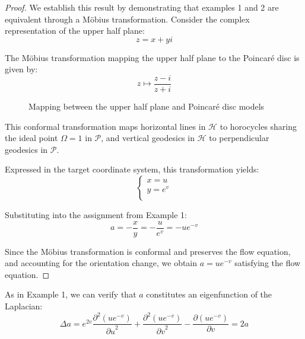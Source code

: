\documentclass[12pt]{article}
\begin{document}
\begin{proof}
We establish this result by demonstrating that examples 1 and 2 are equivalent through a Möbius transformation. Consider the complex representation of the upper half plane:
$$
z = x + yi
$$

The Möbius transformation mapping the upper half plane to the Poincaré disc is given by:
$$
z \mapsto \frac{z-i}{z+i}
$$

\begin{figure}[ht]
\centering
{}
\caption{Mapping between the upper half plane and Poincaré disc models}\label{fig:mapping-full}
\end{figure}

This conformal transformation maps horizontal lines in $\mathcal{H}$ to horocycles sharing the ideal point $\Omega = 1$ in $\mathcal{P}$, and vertical geodesics in $\mathcal{H}$ to perpendicular geodesics in $\mathcal{P}$.

Expressed in the target coordinate system, this transformation yields:
$$
\begin{cases}
x = u\\
y = e^v \\
\end{cases}
$$

Substituting into the assignment from Example 1:
$$
a = -\frac{x}{y} = -\frac{u}{e^v} = -u e^{-v}
$$

Since the Möbius transformation is conformal and preserves the flow equation, and accounting for the orientation change, we obtain $a = u e^{-v}$ satisfying the flow equation.
\end{proof}

As in Example 1, we can verify that $a$ constitutes an eigenfunction of the Laplacian:
$$
\Delta a = e^{2v} \frac{\partial^2(u e^{-v})}{{\partial u}^2} + \frac{\partial^2(u e^{-v})}{{\partial v}^2} - \frac{\partial(u e^{-v})}{\partial v} = 2a
$$
\end{document}
